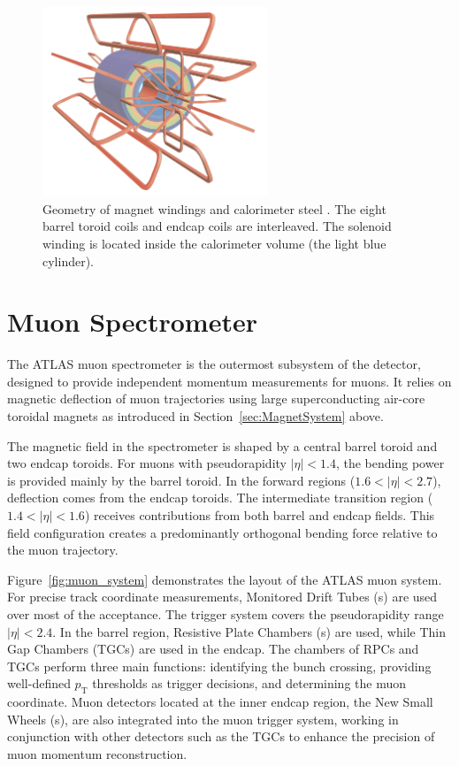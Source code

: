 \begin{figure}[htbp]
  \centering
  \includegraphics[width=0.6\textwidth]{figs/chapter2/magnet_windings.png}
  \caption{Geometry of magnet windings and calorimeter steel \cite{ATLASDetector2008}. The eight barrel toroid coils and endcap coils are interleaved. The solenoid winding is located inside the calorimeter volume (the light blue cylinder).}
  \label{fig:magnet_windings}
\end{figure}

\section{Muon Spectrometer} \label{sec:MuonSpectrometer}
The ATLAS muon spectrometer is the outermost subsystem of the detector, designed to provide independent momentum measurements for muons. It relies on magnetic deflection of muon trajectories using large superconducting air-core toroidal magnets as introduced in Section~\ref{sec:MagnetSystem} above.

The magnetic field in the spectrometer is shaped by a central barrel toroid and two endcap toroids. For muons with pseudorapidity $|\eta| < 1.4$, the bending power is provided mainly by the barrel toroid. In the forward regions ($1.6 < |\eta| < 2.7$), deflection comes from the endcap toroids. The intermediate transition region ($1.4 < |\eta| < 1.6$) receives contributions from both barrel and endcap fields. This field configuration creates a predominantly orthogonal bending force relative to the muon trajectory. 

Figure~\ref{fig:muon_system} demonstrates the layout of the ATLAS muon system. For precise track coordinate measurements, Monitored Drift Tubes ({\MDT}s) are used over most of the acceptance. The trigger system covers the pseudorapidity range $|\eta| < 2.4$. In the barrel region, Resistive Plate Chambers ({\RPC}s) are used, while Thin Gap Chambers ({TGC}s) are used in the endcap. The chambers of RPCs and TGCs perform three main functions: identifying the bunch crossing, providing well-defined $p_\mathrm{T}$ thresholds as trigger decisions, and determining the muon coordinate. Muon detectors located at the inner endcap region, the New Small Wheels ({\NSW}s), are also integrated into the muon trigger system, working in conjunction with other detectors such as the TGCs to enhance the precision of muon momentum reconstruction.

